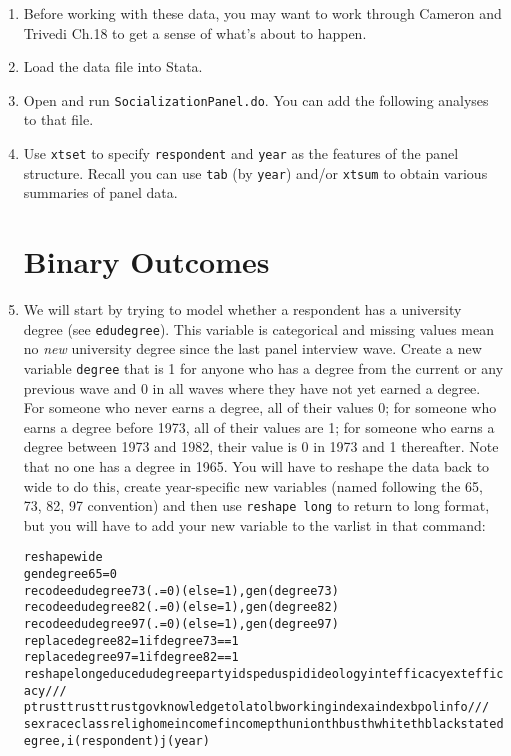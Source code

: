 \documentclass[a4paper,12pt]{article}
\begin{document}
\begin{enumerate}\itemsep1em

\item Before working with these data, you may want to work through Cameron and Trivedi Ch.18 to get a sense of what's about to happen.

\item Load the data file into Stata.

\item Open and run \texttt{SocializationPanel.do}. You can add the following analyses to that file.

\item Use \texttt{xtset} to specify \texttt{respondent} and \texttt{year} as the features of the panel structure. Recall you can use \texttt{tab} (by \texttt{year}) and/or \texttt{xtsum} to obtain various summaries of panel data.

\section{Binary Outcomes}

\item We will start by trying to model whether a respondent has a university degree (see \texttt{edudegree}). This variable is categorical and missing values mean no \textit{new} university degree since the last panel interview wave. Create a new variable \texttt{degree} that is 1 for anyone who has a degree from the current or any previous wave and 0 in all waves where they have not yet earned a degree. For someone who never earns a degree, all of their values 0; for someone who earns a degree before 1973, all of their values are 1; for someone who earns a degree between 1973 and 1982, their value is 0 in 1973 and 1 thereafter. Note that no one has a degree in 1965. You will have to reshape the data back to wide to do this, create year-specific new variables (named following the 65, 73, 82, 97 convention) and then use \texttt{reshape long} to return to long format, but you will have to add your new variable to the varlist in that command:

\begin{alltt}
reshape wide
gen degree65 = 0
recode edudegree73 (.=0) (else=1), gen(degree73)
recode edudegree82 (.=0) (else=1), gen(degree82)
recode edudegree97 (.=0) (else=1), gen(degree97)
replace degree82 = 1 if degree73 == 1
replace degree97 = 1 if degree82 == 1
reshape long educ edudegree partyid spedu spid ideology intefficacy extefficacy ///
             ptrust trust trustgov knowledge tola tolb working indexa indexb polinfo ///
             sex race class relig home incomef incomep thunion thbus thwhite thblack state degree, i(respondent) j(year)
\end{alltt}


\end{enumerate}
\end{document}
